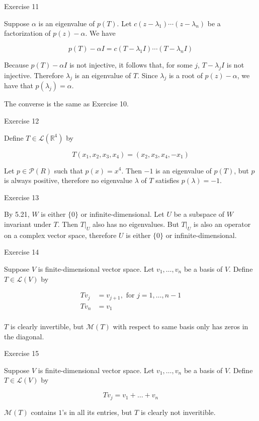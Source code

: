 \documentclass{article}
\begin{document}
Exercise 11

Suppose $\alpha$ is an eigenvalue of $p(T)$. Let $c(z - \lambda_1) \dotsm (z - \lambda_n)$ be a factorization of $p(z) - \alpha$. We have

$$ p(T) - \alpha I = c(T - \lambda_1 I) \dotsm (T - \lambda_n I) $$

Because $p(T) - \alpha I$ is not injective, it follows that, for some $j$, $T - \lambda_j I$ is not injective. Therefore $\lambda_j$ is an eigenvalue of $T$. Since $\lambda_j$ is a root of $p(z) - \alpha$, we have that $p(\lambda_j) = \alpha$.

The converse is the same as Exercise 10.

Exercise 12

Define $T \in \mathcal{L}(\mathbb{R}^4)$ by

$$ T(x_1, x_2, x_3, x_4) = (x_2, x_3, x_4, -x_1) $$

Let $p \in \mathcal{P}(R)$ such that $p(x) = x^4$. Then $-1$ is an eigenvalue of $p(T)$, but $p$ is always positive, therefore no eigenvalue $\lambda$ of $T$ satisfies $p(\lambda) = -1$.

Exercise 13

By 5.21, $W$ is either $\{0\}$ or infinite-dimensional. Let $U$ be a subspace of $W$ invariant under $T$. Then $T\rvert_U$ also has no eigenvalues. But $T\rvert_U$ is also an operator on a complex vector space, therefore $U$ is either $\{0\}$ or infinite-dimensional.

Exercise 14

Suppose $V$ is finite-dimensional vector space. Let $v_1, \dots, v_n$ be a basis of $V$. Define $T \in \mathcal{L}(V)$ by

$$ \begin{aligned} Tv_j &= v_{j+1}, \text{ for } j = 1, \dots, n - 1\\ Tv_n &= v_1\\ \end{aligned} $$

$T$ is clearly invertible, but $\mathcal{M}(T)$ with respect to same basis only has zeros in the diagonal.

Exercise 15

Suppose $V$ is finite-dimensional vector space. Let $v_1, \dots, v_n$ be a basis of $V$. Define $T \in \mathcal{L}(V)$ by

$$ Tv_j = v_1 + \dots + v_n $$

$\mathcal{M}(T)$ contains $1$'s in all its entries, but $T$ is clearly not inveritible.
\end{document}
